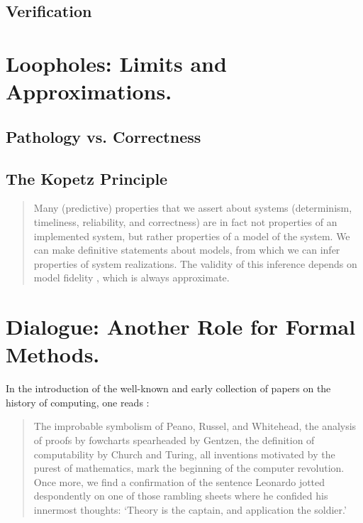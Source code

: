 \documentclass[]{article}
\begin{document}
\subsection{Verification}


{\color{red}{Note by Selmer on Different notions of Verification. Can he turn it into something that fits here?}}



\section{Loopholes: Limits and Approximations.}

\subsection{Pathology vs. Correctness}

{\color{red}{Liesbeth?}}



\subsection{The Kopetz Principle}%

{\color{red}{Passage inspired by Edgar}}


\begin{quote}
	Many (predictive) properties that we assert about systems (determinism, timeliness, reliability, and correctness) are in fact not properties of an implemented system, but rather properties of a model of	the system.
	We can make definitive statements about
	models, from which we can infer properties of system realizations. The validity of this inference depends on model fidelity , which is always approximate.
\end{quote}



\section{Dialogue: Another Role for Formal Methods.}

{\color{red}{Passage inspired by Liesbeth}}


In the introduction of the well-known and early collection of papers on the
history of computing, one reads \cite[p???]{??}:

\begin{quote}
The improbable symbolism of Peano, Russel, and Whitehead, the
analysis of proofs by fowcharts spearheaded by Gentzen, the definition of computability by Church and Turing, all inventions motivated by the purest of mathematics, mark the beginning of the computer revolution. Once more, we find a confirmation of the sentence Leonardo jotted despondently on one of those rambling sheets where he confided his innermost thoughts: `Theory is the captain,
and application the soldier.' 
\end{quote}
\end{document}
